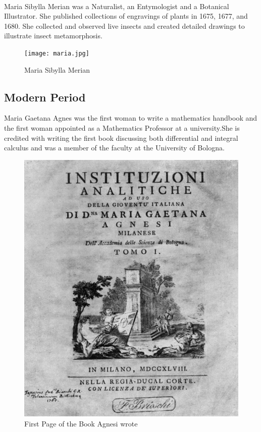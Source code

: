 \documentclass[a4paper,10pt]{article}
\begin{document}
\newblock
\\
Maria Sibylla Merian was a Naturalist, an Entymologist and a Botanical Illustrator. She published collections of engravings of plants in 1675, 1677, and 1680. She collected and observed live insects and created detailed drawings to illustrate insect metamorphosis.\cite{merian}


\begin{center}
\begin{figure}[h]
\centering
 \texttt{[image: maria.jpg]}
 \caption{Maria Sibylla Merian}
\end{figure}
\end{center}

\subsection{Modern Period}

\newblock
Maria Gaetana Agnes was the first woman to write a mathematics handbook and the first woman appointed as a Mathematics Professor at a university.She is credited with writing the first book discussing both differential and integral calculus and was a member of the faculty at the University of Bologna\cite{agnesi}.

\begin{center}
\begin{figure}[h]
\centering
 \includegraphics[scale=0.9]{agnesi.png}
 \caption{First Page of the Book Agnesi wrote}
\end{figure}
\end{center}
\end{document}
